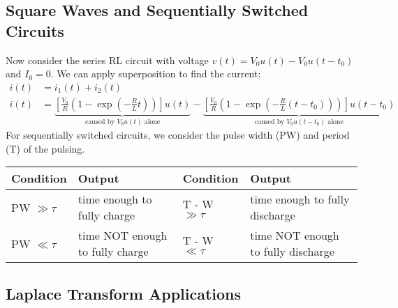 \documentclass[a4paper,11pt]{article}
\begin{document}
	\subsection{Square Waves and Sequentially Switched Circuits}
	Now consider the series RL circuit with voltage $v(t) = V_0u(t) - V_0u(t - t_0)$ and $I_0 = 0$. We can apply superposition to find the current:
	\begin{align*}
		i(t) &= i_1(t) + i_2(t) \\ 
		i(t) &= \underbrace{\left[\frac{V_0}{R} \left( 1 - \exp \left( -\frac{R}{L}t \right) \right) \right]u(t)}_\text{caused by $V_0u(t)$ alone} - \underbrace{\left[\frac{V_0}{R} \left(1 - \exp \left( -\frac{R}{L}(t - t_0) \right) \right) \right]u(t - t_0)}_\text{caused by $V_0u(t - t_0)$ alone}
	\end{align*}
	For sequentially switched circuits, we consider the pulse width (PW) and period (T) of the pulsing. 
	\begin{center}
	\begin{tabular}{|l|l|l|l|}
		\hline
		Condition & Output & Condition & Output \\ \hline
		PW $\gg \tau$ & time enough to fully charge & T - W $\gg \tau$ & time enough to fully discharge \\ \hline
		PW $\ll \tau$ & time NOT enough to fully charge & T - W $\ll \tau$ & time NOT enough to fully discharge \\ \hline
	\end{tabular}
	\end{center}

	\subsection{Laplace Transform Applications}
\end{document}
